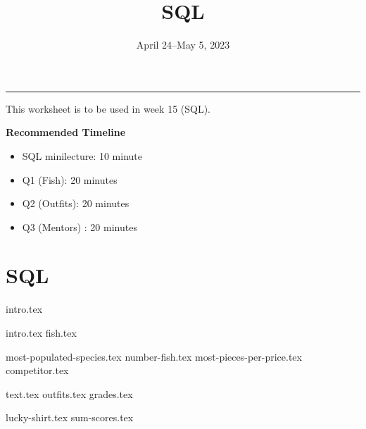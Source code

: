 \documentclass{exam}
\title{SQL}
\date{April 24--May 5, 2023}
\begin{document}
\maketitle\rule{\textwidth}{0.15em}

This worksheet is to be used in week 15 (SQL).

\begin{guide}

    \textbf{Recommended Timeline}
    \begin{itemize}
        \item SQL minilecture: 10 minute
        \item Q1 (Fish): 20 minutes
        \item Q2 (Outfits): 20 minutes
        \item Q3 (Mentors) : 20 minutes
    \end{itemize}
\end{guide}


\section{SQL}
{intro.tex}
\newpage
\begin{questions}
  \question 
  {intro.tex}
  {fish.tex}
  \begin{parts}
    {most-populated-species.tex}
    {number-fish.tex}
    {most-pieces-per-price.tex}
    {competitor.tex}
  \end{parts}

  \newpage
  \question
  {text.tex}
  {outfits.tex}
  {grades.tex}
  \begin{parts}
  {lucky-shirt.tex}
  {sum-scores.tex}
  \end{parts}

  \newpage
  \question
  {}
  {}
  {}
  \begin{parts}
    {}
    {}
  \end{parts}
\end{questions}
\end{document}
